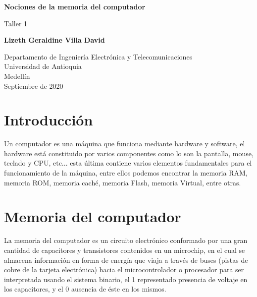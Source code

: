 \documentclass{article}
\begin{document}
\begin{titlepage}
    \begin{center}
        \vspace*{1cm}
            
        \Huge
        \textbf{Nociones de la memoria del computador}
            
        \vspace{0.5cm}
        \LARGE
        Taller 1
            
        \vspace{1.5cm}
            
        \textbf{Lizeth Geraldine Villa David}
            
        \vfill
            
        \vspace{0.8cm}
            
        \Large
        Departamento de Ingeniería Electrónica y Telecomunicaciones\\
        Universidad de Antioquia\\
        Medellín\\
        Septiembre de 2020
            
    \end{center}
\end{titlepage}
\newpage 

\tableofcontents

\section{Introducción}\label{contenido}


Un computador es una máquina que funciona mediante hardware y software, 
el hardware está constituido por varios componentes
como lo son la pantalla, mouse, teclado y CPU, etc... esta última contiene varios 
elementos fundamentales para el funcionamiento de la máquina, 
entre ellos podemos encontrar la memoria RAM, memoria ROM, memoria caché, 
memoria Flash, memoria Virtual, entre otras. 

\section{Memoria del computador}\label{contenido}

La memoria del computador es un circuito electrónico conformado por una gran cantidad de 
capacitores y transistores contenidos en un microchip, en el cual se almacena información en forma de energía que viaja a través de buses (pistas de cobre de la tarjeta electrónica) hacia el microcontrolador o procesador para ser interpretada usando el sistema binario, el 1 representado presencia de voltaje en los capacitores, y el 0 ausencia de éste en los mismos.
\end{document}
